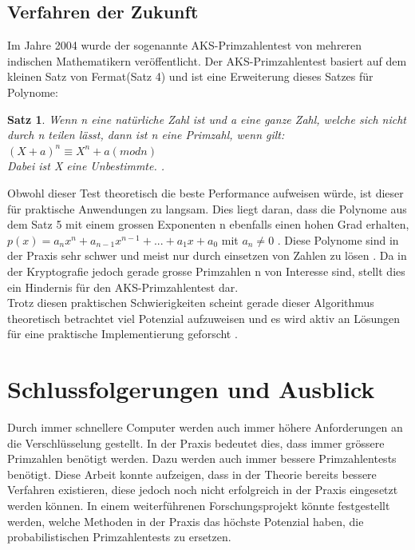 \documentclass[12pt,a4paper]{article}
\newtheorem{theorem}{Satz}
\begin{document}
\subsection{Verfahren der Zukunft}
Im Jahre 2004 wurde der sogenannte AKS-Primzahlentest von mehreren indischen Mathematikern veröffentlicht. Der AKS-Primzahlentest basiert auf dem kleinen Satz von Fermat(Satz 4) und ist eine Erweiterung dieses Satzes für Polynome:

\begin{theorem}
Wenn n eine natürliche Zahl ist und a eine ganze Zahl, welche sich nicht durch n teilen lässt, dann ist n eine Primzahl, wenn gilt:\\
$(X+a)^{n}\equiv X^{n} + a (mod n)$ \\
Dabei ist X eine Unbestimmte. \cite{ManindraAgrawalNeerajKayalNitinSaxena.2002}.
\end{theorem}
\newpage
Obwohl dieser Test theoretisch die beste Performance aufweisen würde, ist dieser für praktische Anwendungen zu langsam. Dies liegt daran, dass die Polynome aus dem Satz 5 mit einem grossen Exponenten n ebenfalls einen hohen Grad erhalten, $p(x) = a_{n}x^{n}+a_{n-1}x^{n-1}+...+a_{1}x+a_{0}$ mit $a_{n} \neq 0$ \cite{OliverBraun.2009}. Diese Polynome sind in der Praxis sehr schwer und meist nur durch einsetzen von Zahlen zu lösen \cite{Forster.2015}. Da in der Kryptografie jedoch gerade grosse Primzahlen n von Interesse sind, stellt dies ein Hindernis für den AKS-Primzahlentest dar.\\
Trotz diesen praktischen Schwierigkeiten scheint gerade dieser Algorithmus theoretisch betrachtet viel Potenzial aufzuweisen und es wird aktiv an Lösungen für eine praktische Implementierung geforscht \cite{Prof.Dr.FolkmarBornemann.2002}.

\section{Schlussfolgerungen und Ausblick}
Durch immer schnellere Computer werden auch immer höhere Anforderungen an die Verschlüsselung gestellt. In der Praxis bedeutet dies, dass immer grössere Primzahlen benötigt werden. Dazu werden auch immer bessere Primzahlentests benötigt. Diese Arbeit konnte aufzeigen, dass in der Theorie bereits bessere Verfahren existieren, diese jedoch noch nicht erfolgreich in der Praxis eingesetzt werden können. In einem weiterführenen Forschungsprojekt könnte festgestellt werden, welche Methoden in der Praxis das höchste Potenzial haben, die probabilistischen Primzahlentests zu ersetzen.

\newpage


\medskip

\newpage
\end{document}
